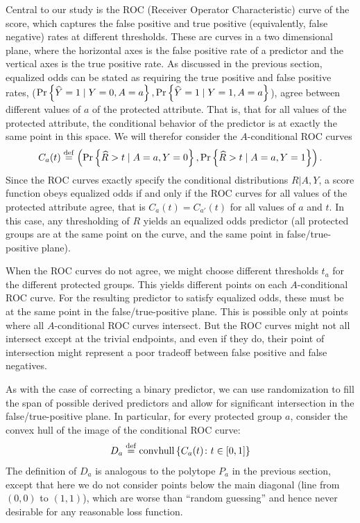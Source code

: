 Central to our study is the ROC (Receiver Operator Characteristic)
curve of the score, which captures the false positive and true
positive (equivalently, false negative) rates at different thresholds.
These are curves in a two dimensional plane, where the horizontal axes
is the false positive rate of a predictor and the vertical axes is the
true positive rate.  As discussed in the previous section, equalized
odds can be stated as requiring the true positive and false positive
rates, ($\Pr\left\{\widehat{Y}=1 \mid Y=0,A=a\right\},\Pr\left\{\widehat{Y}=1
  \mid Y=1,A=a\right\}$), agree between different values of $a$ of the
protected attribute.  That is, that for all values of the protected
attribute, the conditional behavior of the predictor is at exactly the
same point in this space.  We will therefor consider the
$A$-conditional ROC curves
\[
C_a(t)\stackrel{\small \mathrm{def}}{=}\left(
\Pr\left\{\widehat{R} > t \mid A=a, Y=0\right\},
\Pr\left\{\widehat{R} > t \mid A=a, Y=1\right\}\right).
\]
Since the ROC curves exactly specify the conditional distributions $R|A,Y$,
a score function obeys equalized odds if and only if the ROC curves for all
values of the protected attribute agree, that is $C_a(t)=C_{a'}(t)$
for all values of $a$ and $t$.  In this case, any thresholding of $R$
yields an equalized odds predictor (all protected groups are at the
same point on the curve, and the same point in false/true-positive
plane).

When the ROC curves do not agree, we might choose different thresholds $t_a$
for the different protected groups.  This yields different points on
each $A$-conditional ROC curve.  For the resulting predictor to satisfy
equalized odds, these must be at the same point in the
false/true-positive plane.  This is possible only at points where all
$A$-conditional ROC curves intersect.  But the ROC curves might not all intersect
except at the trivial endpoints, and even if they do, their point of
intersection might represent a poor tradeoff between false positive
and false negatives.

As with the case of correcting a binary predictor, we can use
randomization to fill the span of possible derived predictors and
allow for significant intersection in the false/true-positive plane.
In particular, for every protected group $a$, consider the convex hull
of the image of the conditional ROC curve:
\begin{equation}\label{eq:conv-hull-threshold}
D_a  \stackrel{\small \mathrm{def}}{=}
\mathrm{convhull}\left\{ C_a(t)\colon t\in[0,1]\right\}
\end{equation}
The definition of $D_a$ is analogous to the polytope $P_a$ in the
previous section, except that here we do not consider points below the
main diagonal (line from $(0,0)$ to $(1,1)$), which are worse than
``random guessing'' and hence never desirable for any reasonable loss
function.  

